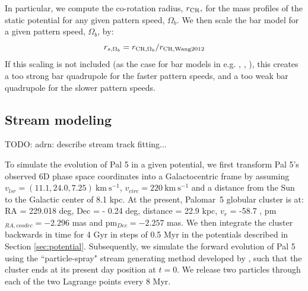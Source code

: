 \documentclass[twocolumn]{aastex62}
\newcommand{\msun}{\textrm{M}_\odot}
\newcommand{\kms}{\ensuremath{\textrm{km}~\textrm{s}^{-1}}}
\newcommand{\todo}[1]{{\color{red} TODO: #1}}
\begin{document}
In particular, we compute the co-rotation radius, $r_{\rm CR},$ for the mass profiles of the static potential for any given pattern speed, $\Omega_b$.
We then scale the bar model for a given pattern speed, $\Omega_b$, by:
\begin{equation}
r_{s, \Omega_b}  = r_{{\rm CR}, \Omega_b}/r_{{\rm CR, Wang 2012}}
\end{equation}
If this scaling is not included (as the case for bar models in e.g. %
\citealt{Pearson:2017}, \citealt{Erkal:2017}, \citealt{Banik:2019}), this creates a too strong bar quadrupole for the faster pattern speeds, and a too weak bar quadrupole for the slower pattern speeds.

%


\subsection{Stream modeling}
\label{sec:modeling}

\todo{adrn: describe stream track fitting...}

To simulate the evolution of Pal 5 in a given potential, we first transform Pal 5's observed 6D phase space coordinates into a Galactocentric frame by assuming $v_{lsr} = (11.1, 24.0, 7.25) ~\kms$,  $v_{circ} = 220  ~\kms$ and a distance from the Sun to the Galactic center of 8.1 kpc.
At the present, Palomar~5 globular cluster is at: RA = 229.018 deg, Dec = - 0.24 deg, distance = 22.9 kpc, $v_r$ = -58.7 , pm$_{RA,cosdec}= -2.296$ mas and pm$_{Dec} = -2.257$ mas.
We then integrate the cluster backwards in time for 4 Gyr in steps of 0.5 Myr in the potentials described in Section \ref{sec:potential}.
Subsequently, we simulate the forward evolution of Pal 5 using the ``particle-spray" stream generating method developed by \citet{Fardal:2015}, such that the cluster ends at its present day position at $t = 0$.
We release two particles through each of the two Lagrange points every 8 Myr.
\end{document}
